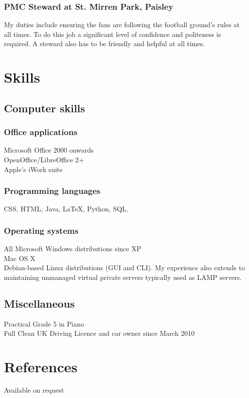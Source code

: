 \documentclass[10pt,a4paper]{article}
\begin{document}
\subsubsection*{PMC Steward at St. Mirren Park, Paisley}
My duties include ensuring the fans are following the football ground's rules at all times. To do this job a significant level of confidence and politeness is required. A steward also has to be friendly and helpful at all times.
\section*{Skills}
\subsection*{Computer skills}
\subsubsection*{Office applications}
Microsoft Office 2000 onwards\\
OpenOffice/LibreOffice 2+\\
Apple's iWork suite
\subsubsection*{Programming languages}
CSS, HTML, Java, \LaTeX, Python, SQL.
\subsubsection*{Operating systems}
All Microsoft Windows distributions since XP\\
Mac OS X\\
Debian-based Linux distributions (GUI and CLI). My experience also extends to maintaining unmanaged virtual private servers typically used as LAMP servers.
\subsection*{Miscellaneous}
Practical Grade 5 in Piano\\
Full Clean UK Driving Licence and car owner since March 2010
\section*{References}
Available on request
\end{document}
